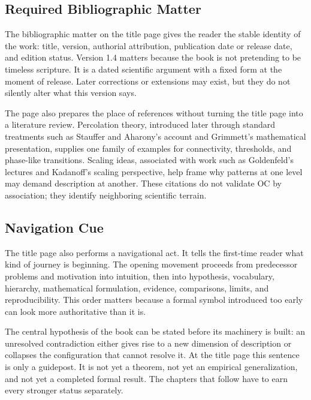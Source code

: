 \documentclass[11pt,a4paper,openany]{book}
\begin{document}
\subsection{Required Bibliographic Matter}
The bibliographic matter on the title page gives the reader the stable identity of the work: title, version, authorial attribution, publication date or release date, and edition status. Version 1.4 matters because the book is not pretending to be timeless scripture. It is a dated scientific argument with a fixed form at the moment of release. Later corrections or extensions may exist, but they do not silently alter what this version says. \cite{stauffer_percolation,grimmett_percolation}\par
The page also prepares the place of references without turning the title page into a literature review. Percolation theory, introduced later through standard treatments such as Stauffer and Aharony's account and Grimmett's mathematical presentation, supplies one family of examples for connectivity, thresholds, and phase-like transitions. Scaling ideas, associated with work such as Goldenfeld's lectures and Kadanoff's scaling perspective, help frame why patterns at one level may demand description at another. These citations do not validate OC by association; they identify neighboring scientific terrain.\par
\subsection{Navigation Cue}
The title page also performs a navigational act. It tells the first-time reader what kind of journey is beginning. The opening movement proceeds from predecessor problems and motivation into intuition, then into hypothesis, vocabulary, hierarchy, mathematical formulation, evidence, comparisons, limits, and reproducibility. This order matters because a formal symbol introduced too early can look more authoritative than it is. \cite{stauffer_percolation,grimmett_percolation}\par
The central hypothesis of the book can be stated before its machinery is built: an unresolved contradiction either gives rise to a new dimension of description or collapses the configuration that cannot resolve it. At the title page this sentence is only a guidepost. It is not yet a theorem, not yet an empirical generalization, and not yet a completed formal result. The chapters that follow have to earn every stronger status separately.\par
\end{document}

